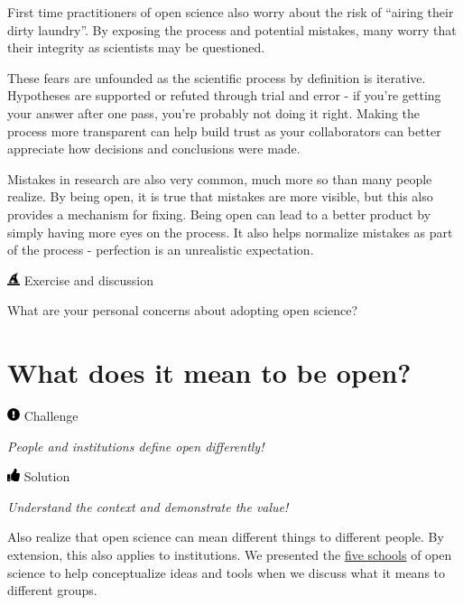 \documentclass[
  letterpaper,
  DIV=11,
  numbers=noendperiod]{scrreprt}
\begin{document}
First time practitioners of open science also worry about the risk of
``airing their dirty laundry''. By exposing the process and potential
mistakes, many worry that their integrity as scientists may be
questioned.

These fears are unfounded as the scientific process by definition is
iterative. Hypotheses are supported or refuted through trial and error -
if you're getting your answer after one pass, you're probably not doing
it right. Making the process more transparent can help build trust as
your collaborators can better appreciate how decisions and conclusions
were made.

Mistakes in research are also very common, much more so than many people
realize. By being open, it is true that mistakes are more visible, but
this also provides a mechanism for fixing. Being open can lead to a
better product by simply having more eyes on the process. It also helps
normalize mistakes as part of the process - perfection is an unrealistic
expectation.

\includegraphics[width=1em,height=1em]{./implement_files/figure-pdf/fa-icon-20d474448f872ee43905e611a2502347.pdf}
Exercise and discussion

What are your personal concerns about adopting open science?

\hypertarget{what-does-it-mean-to-be-open}{%
\section{What does it mean to be
open?}\label{what-does-it-mean-to-be-open}}

\includegraphics[width=1em,height=1em]{./implement_files/figure-pdf/fa-icon-e38cc40f3c6469ef5f44a7764a5c5910.pdf}
Challenge

\emph{People and institutions define open differently!}

\includegraphics[width=1em,height=1em]{./implement_files/figure-pdf/fa-icon-e4ee65476be467d7be8a1ae9cb02ffda.pdf}
Solution

\emph{Understand the context and demonstrate the value!}

Also realize that open science can mean different things to different
people. By extension, this also applies to institutions. We presented
the \protect\hyperlink{schools}{five schools} of open science to help
conceptualize ideas and tools when we discuss what it means to different
groups.
\end{document}
